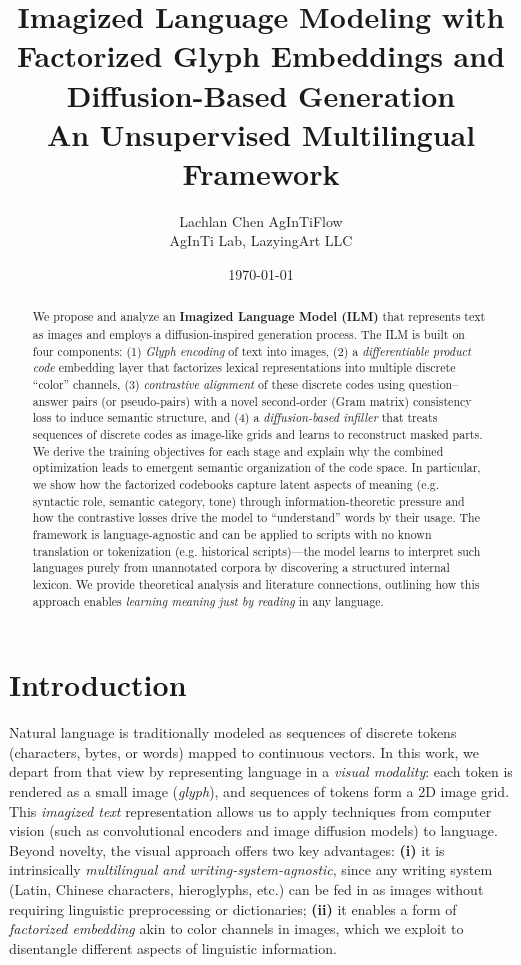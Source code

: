 \documentclass[10pt,twocolumn]{article}
\title{Imagized Language Modeling with Factorized Glyph Embeddings and Diffusion-Based Generation\\\large An Unsupervised Multilingual Framework}
\author{\begin{tabular}{c}Lachlan Chen \quad AgInTiFlow\\AgInTi Lab, LazyingArt LLC\end{tabular}}
\date{\today}
\begin{document}
\maketitle

\begin{abstract}
We propose and analyze an \textbf{Imagized Language Model (ILM)} that represents text as images and employs a diffusion-inspired generation process. The ILM is built on four components: (1) \emph{Glyph encoding} of text into images, (2) a \emph{differentiable product code} embedding layer that factorizes lexical representations into multiple discrete ``color'' channels, (3) \emph{contrastive alignment} of these discrete codes using question--answer pairs (or pseudo-pairs) with a novel second-order (Gram matrix) consistency loss to induce semantic structure, and (4) a \emph{diffusion-based infiller} that treats sequences of discrete codes as image-like grids and learns to reconstruct masked parts. We derive the training objectives for each stage and explain why the combined optimization leads to emergent semantic organization of the code space. In particular, we show how the factorized codebooks capture latent aspects of meaning (e.g. syntactic role, semantic category, tone) through information-theoretic pressure and how the contrastive losses drive the model to ``understand'' words by their usage. The framework is language-agnostic and can be applied to scripts with no known translation or tokenization (e.g. historical scripts)---the model learns to interpret such languages purely from unannotated corpora by discovering a structured internal lexicon. We provide theoretical analysis and literature connections, outlining how this approach enables \emph{learning meaning just by reading} in any language.
\end{abstract}

\section{Introduction}
Natural language is traditionally modeled as sequences of discrete tokens (characters, bytes, or words) mapped to continuous vectors. In this work, we depart from that view by representing language in a \emph{visual modality}: each token is rendered as a small image (\emph{glyph}), and sequences of tokens form a 2D image grid. This \emph{imagized text} representation allows us to apply techniques from computer vision (such as convolutional encoders and image diffusion models) to language. Beyond novelty, the visual approach offers two key advantages: \textbf{(i)} it is intrinsically \emph{multilingual and writing-system-agnostic}, since any writing system (Latin, Chinese characters, hieroglyphs, etc.) can be fed in as images without requiring linguistic preprocessing or dictionaries; \textbf{(ii)} it enables a form of \emph{factorized embedding} akin to color channels in images, which we exploit to disentangle different aspects of linguistic information.
\end{document}
